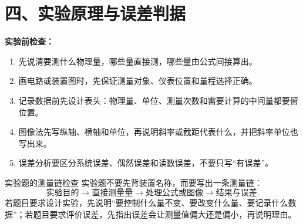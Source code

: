 \newpage
\section*{四、实验原理与误差判据}

\textbf{实验前检查：}
\nopagebreak[4]
\begin{enumerate}
  \item 先说清要测什么物理量，哪些量直接测，哪些量由公式间接算出。
  \item 画电路或装置图时，先保证测量对象、仪表位置和量程选择正确。
  \item 记录数据前先设计表头：物理量、单位、测量次数和需要计算的中间量都要留位置。
  \item 图像法先写纵轴、横轴和单位，再说明斜率或截距代表什么，并把斜率单位也写出来。
  \item 误差分析要区分系统误差、偶然误差和读数误差，不要只写“有误差”。
\end{enumerate}

\begin{learningbox}{实验题的测量链检查}
实验题不要先背装置名称，而要写出一条测量链：
\[
\text{实验目的}\rightarrow\text{直接测量量}\rightarrow\text{处理公式或图像}\rightarrow\text{结果与误差}.
\]
若题目要求设计实验，先说明“要控制什么量不变、要改变什么量、要记录什么数据”；若题目要求评价误差，先指出误差会让测量值偏大还是偏小，再说明理由。
\end{learningbox}

